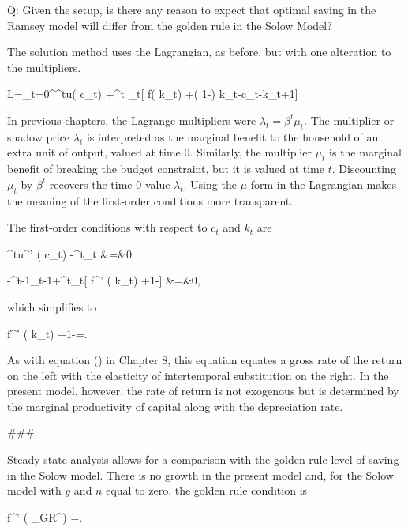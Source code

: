 ﻿\documentclass[oneside]{book}
\begin{document}
Q: Given the setup, is there any reason to expect that optimal saving in the Ramsey model will differ from the golden rule in the Solow Model?

The solution method uses the Lagrangian, as before, but with one alteration to the multipliers.



L=\sum_{t=0}^{\infty }\beta ^{t}u( c_{t}) +\beta ^{t}\mu
_{t}[ f( k_{t}) +( 1-\delta ) k_{t}-c_{t}-k_{t+1}]


In previous chapters, the Lagrange multipliers were $\lambda _{t}=\beta
^{t}\mu _{t}$. The multiplier or shadow price $\lambda _{t}$ is
interpreted as the marginal benefit to the household of an extra unit of
output, valued at time 0. Similarly, the multiplier $\mu _{t}$ is the marginal benefit of breaking the budget constraint, but it is valued at time
$t$. Discounting $\mu _{t}$ by $\beta ^{t}$ recovers the time 0 value $\lambda _{t}$. Using the $\mu $ form in the Lagrangian makes the meaning
of the first-order conditions more transparent.

The first-order conditions with respect to $c_{t}$ and $k_{t}$ are



\beta ^{t}u^{' }( c_{t}) -\beta ^{t}\mu _{t} &=&0

-\beta ^{t-1}\mu _{t-1}+\beta ^{t}\mu _{t}[ f^{' }(
k_{t}) +1-\delta ] &=&0,


which simplifies to



f^{' }( k_{t}) +1-\delta =.


As with equation () in Chapter 8, this equation equates a gross rate of the return on the left with the elasticity of intertemporal substitution on the right. In the present model, however, the rate of return is not exogenous but is determined by the marginal productivity of
capital along with the depreciation rate.



###



Steady-state analysis allows for a comparison with the golden rule level of saving in the Solow model. There is no growth in the present model and, for the Solow model with $g$ and $n$ equal to zero, the golden rule condition
is



f^{' }( \kappa _{GR}^{\ast }) =\delta .
\end{document}
